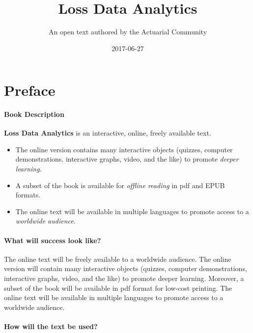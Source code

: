 \documentclass[]{book}
\title{Loss Data Analytics}
\author{An open text authored by the Actuarial Community}
\date{2017-06-27}
\begin{document}
\maketitle

{
\setcounter{tocdepth}{2}
\tableofcontents
}
\chapter*{Preface}\label{preface}

\subsubsection*{Book Description}\label{book-description}

\textbf{Loss Data Analytics} is an interactive, online, freely available
text.

\begin{itemize}
\item
  The online version contains many interactive objects (quizzes,
  computer demonstrations, interactive graphs, video, and the like) to
  promote \emph{deeper learning}.
\item
  A subset of the book is available for \emph{offline reading} in pdf
  and EPUB formats.
\item
  The online text will be available in multiple languages to promote
  access to a \emph{worldwide audience}.
\end{itemize}

\subsubsection*{What will success look
like?}\label{what-will-success-look-like}

The online text will be freely available to a worldwide audience. The
online version will contain many interactive objects (quizzes, computer
demonstrations, interactive graphs, video, and the like) to promote
deeper learning. Moreover, a subset of the book will be available in pdf
format for low-cost printing. The online text will be available in
multiple languages to promote access to a worldwide audience.

\subsubsection*{How will the text be
used?}\label{how-will-the-text-be-used}
\end{document}
